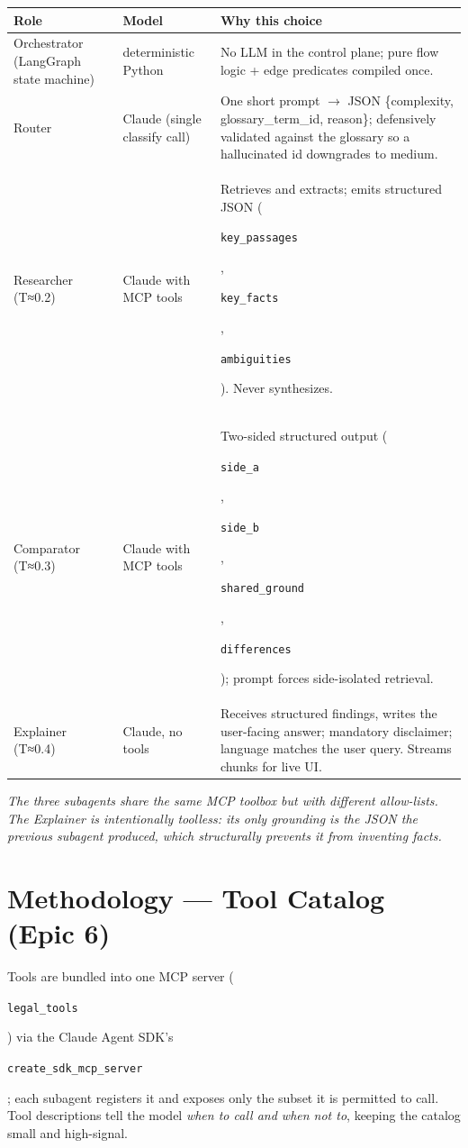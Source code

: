 \documentclass[10pt,a4paper]{article}
\newcommand{\code}[1]{\colorbox{boxbg}{\strut\texttt{\small #1}}}
\begin{document}
\begin{tabularx}{\linewidth}{l l X}
\toprule
\textbf{Role} & \textbf{Model} & \textbf{Why this choice} \\
\midrule
\rowcolor{rowblue}
Orchestrator (LangGraph state machine) & deterministic Python & No LLM in the control plane; pure flow logic + edge predicates compiled once. \\
Router & Claude (single classify call) & One short prompt \(\rightarrow\) JSON \{complexity, glossary\_term\_id, reason\}; defensively validated against the glossary so a hallucinated id downgrades to medium. \\
\rowcolor{rowblue}
Researcher (T≈0.2) & Claude with MCP tools & Retrieves and extracts; emits structured JSON (\code{key\_passages}, \code{key\_facts}, \code{ambiguities}). Never synthesizes. \\
Comparator (T≈0.3) & Claude with MCP tools & Two-sided structured output (\code{side\_a}, \code{side\_b}, \code{shared\_ground}, \code{differences}); prompt forces side-isolated retrieval. \\
\rowcolor{rowblue}
Explainer (T≈0.4) & Claude, no tools & Receives structured findings, writes the user-facing answer; mandatory disclaimer; language matches the user query. Streams chunks for live UI. \\
\bottomrule
\end{tabularx}

\smallskip
\noindent\textit{The three subagents share the same MCP toolbox but with different allow-lists. The Explainer is intentionally toolless: its only grounding is the JSON the previous subagent produced, which structurally prevents it from inventing facts.}

\section{Methodology — Tool Catalog (Epic 6)}

Tools are bundled into one MCP server (\code{legal\_tools}) via the Claude Agent SDK's \code{create\_sdk\_mcp\_server}; each subagent registers it and exposes only the subset it is permitted to call. Tool descriptions tell the model \emph{when to call and when not to}, keeping the catalog small and high-signal.
\end{document}
